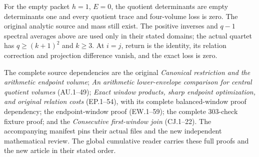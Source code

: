 For the empty packet $h=1$, $E=0$, the quotient determinants are
empty determinants one and every quotient trace and four-volume loss
is zero. The original analytic source and mass still exist. The
positive inverses and $q-1$ spectral averages above are used only
in their stated domains; the actual quartet has $q\ge(k+1)^2$
and $k\ge3$. At $i=j$, return is the identity, its relation correction
and projection difference vanish, and the exact loss is zero.

The complete source dependencies are the original
\emph{Canonical restriction and the arithmetic endpoint volume};
\emph{An arithmetic lower-envelope comparison for central quotient
volumes} (AU.1--49); \emph{Exact window products, sharp endpoint
optimization, and original relation costs} (EP.1--54), with its
complete balanced-window proof dependency; the endpoint-window proof
(EW.1--59); the complete 303-check fixture proof; and the
\emph{Consecutive first-window join} (CJ.1--22).
The accompanying manifest pins their actual files and the new
independent mathematical review. The global cumulative reader carries
these full proofs and the new article in their stated order.

\endgroup
